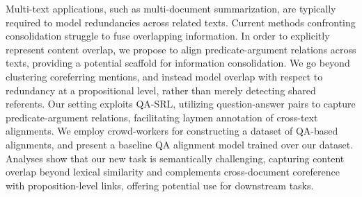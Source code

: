 Multi-text applications, such as multi-document summarization, are typically required to model redundancies across related texts. Current methods confronting consolidation struggle to fuse overlapping information. In order to explicitly represent content overlap, we propose to align predicate-argument relations across texts, providing a potential scaffold for information consolidation. We go beyond clustering coreferring mentions, and instead model overlap with respect to redundancy at a propositional level, rather than merely detecting shared referents. Our setting exploits QA-SRL, utilizing question-answer pairs to capture predicate-argument relations, facilitating laymen annotation of cross-text alignments. We employ crowd-workers for constructing a dataset of QA-based alignments, and present a baseline QA alignment model trained over our dataset. Analyses show that our new task is semantically challenging, capturing content overlap beyond lexical similarity and complements cross-document coreference with proposition-level links, offering potential use for downstream tasks.
